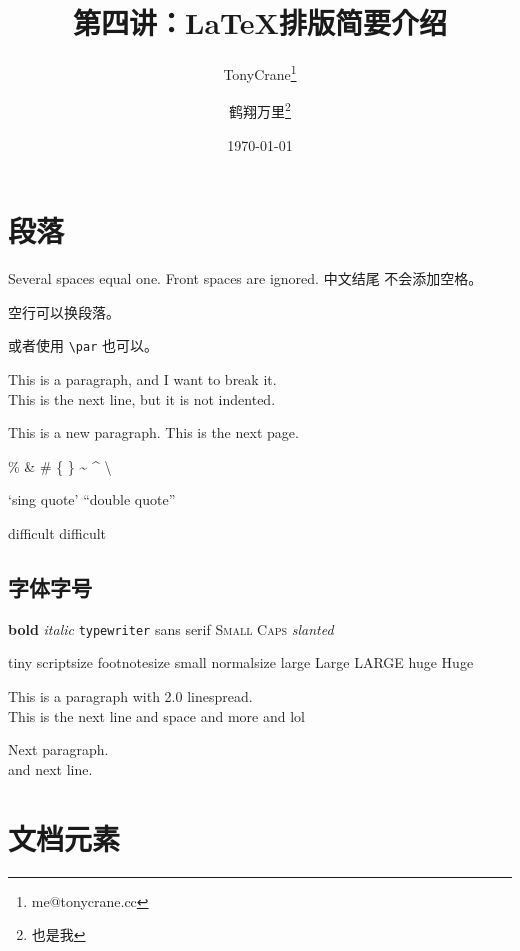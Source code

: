 \documentclass{article}
\title{第四讲：\LaTeX{}排版简要介绍}
\author{TonyCrane\thanks{me@tonycrane.cc}\and 鹤翔万里\thanks{也是我}}
\date{\today}
\begin{document}
\maketitle

\tableofcontents

\listoftables

\section{段落}\label{sec:para}

Several spaces     equal one.
   Front spaces are ignored. 中文结尾
不会添加空格。

空行可以换段落。\par
或者使用 \verb|\par| 也可以。

This is a paragraph, and I want to break it. \\
This is the next line, but it is not indented.

This is a new paragraph.
This is the next page.

\% \& \# \{ \} \~{} \^{} \textbackslash

`sing quote' ``double quote''

difficult dif{}f{}icult

\subsection{字体字号}

\textbf{bold} \textit{italic} \texttt{typewriter}
\textsf{sans serif} \textsc{Small Caps} \textsl{slanted}

{\tiny tiny} {\scriptsize scriptsize} {\footnotesize footnotesize}
{\small small} {\normalsize normalsize} {\large large}
{\Large Large} {\LARGE LARGE} {\huge huge} {\Huge Huge}

{\linespread{2.0}\selectfont This is a paragraph with 2.0 linespread.\\
This is the next line and \quad space and \hspace{3em} more and
\hspace{\fill}lol\par}

\vspace{-1em}Next paragraph.\\[1em] and next line.

\section{文档元素}
\end{document}
